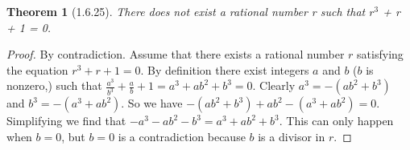 \documentclass[a4paper, 12pt]{article}
\theoremstyle{plain}
\newtheorem*{theorem*}{Theorem}
\begin{document}
	
	\begin{theorem*}[1.6.25]
		There does not exist a rational number r such that \newline $r^{3}$ + r + 1 = 0.
	\end{theorem*}
	
	\begin{proof}
		By contradiction. Assume that there exists a rational number $r$ \newline satisfying the equation $r^{3} + r + 1 = 0$. By definition there exist integers $a$ and $b$ ($b$ is nonzero,) such that $\frac{a^{3}}{b^{3}} + \frac{a}{b} + 1 = a^{3} + ab^{2} + b^{3} = 0$. Clearly $a^{3} = -(ab^{2} + b^{3})$ and $b^{3} = -(a^{3} + ab^{2})$. So we have $-(ab^{2} + b^{3}) + ab^{2} - (a^{3} + ab^{2}) = 0$. Simplifying we find that $-a^{3} -ab^{2} - b^{3} = a^{3} + ab^{2} + b^{3}$. This can only happen when $b = 0$, but $b = 0$ is a contradiction because $b$ is a divisor in $r$.
	\end{proof}
\end{document}
